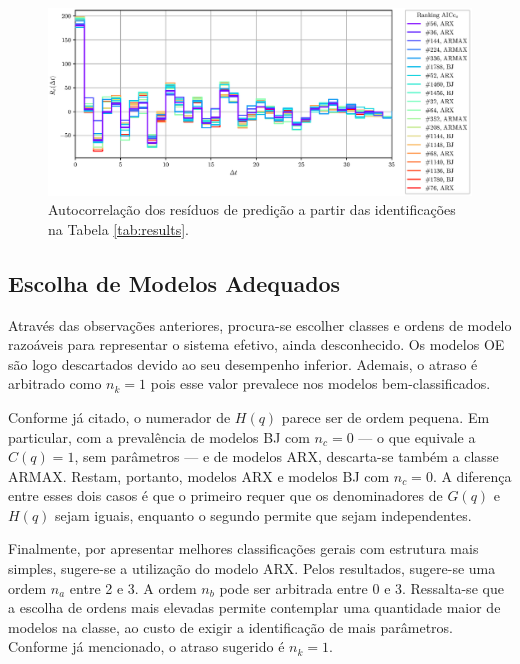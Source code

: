\documentclass{ppgeesa}
\begin{document}
\begin{figure}[!htbp]
  \centering
  \includegraphics[width=\linewidth]{residue_autocorrelation_AICCv}
  \caption{Autocorrelação dos resíduos de predição a partir das identificações na Tabela \ref{tab:results}.}
  \label{fig:residue-autocorrelation}
\end{figure}

\subsection{Escolha de Modelos Adequados}
Através das observações anteriores, procura-se escolher classes e ordens de modelo razoáveis para representar o sistema efetivo, ainda desconhecido.
Os modelos OE são logo descartados devido ao seu desempenho inferior.
Ademais, o atraso é arbitrado como $n_k = 1$ pois esse valor prevalece nos modelos bem-classificados.

Conforme já citado, o numerador de $H(q)$ parece ser de ordem pequena.
Em particular, com a prevalência de modelos BJ com $n_c = 0$ --- o que equivale a $C(q) = 1$, sem parâmetros --- e de modelos ARX, descarta-se também a classe ARMAX.
Restam, portanto, modelos ARX e modelos BJ com $n_c = 0$.
A diferença entre esses dois casos é que o primeiro requer que os denominadores de $G(q)$ e $H(q)$ sejam iguais, enquanto o segundo permite que sejam independentes.

Finalmente, por apresentar melhores classificações gerais com estrutura mais simples, sugere-se a utilização do modelo ARX.
Pelos resultados, sugere-se uma ordem $n_a$ entre 2 e 3.
A ordem $n_b$ pode ser arbitrada entre 0 e 3.
Ressalta-se que a escolha de ordens mais elevadas permite contemplar uma quantidade maior de modelos na classe, ao custo de exigir a identificação de mais parâmetros.
Conforme já mencionado, o atraso sugerido é $n_k = 1$.
\end{document}
